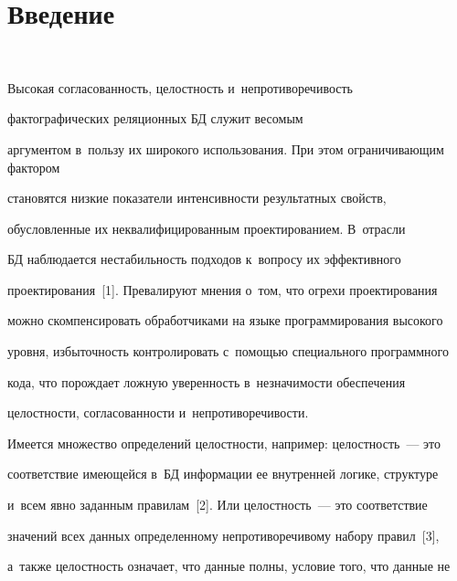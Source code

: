 





 \thispagestyle{headings}

 

 \vspace*{-18pt}

  

\section{Введение}



\vspace*{-2pt}

\

  Высокая согласованность, целостность и~непротиворечивость 

фактографических реляционных БД служит весомым 

аргументом в~пользу их широкого использования. При этом ограничивающим фактором 

становятся низкие показатели интенсивности результатных свойств, 

обусловленные их неквалифицированным проектированием. В~отрасли 

БД наблюдается нестабильность подходов к~вопросу их эффективного 

проектирования~[1]. Превалируют мнения о~том, что огрехи проектирования 

можно скомпенсировать обработчиками на языке программирования высокого 

уровня, избыточность контролировать с~помощью специального программного 

кода, что порождает ложную уверенность в~незначимости обеспечения 

целостности, согласованности и~непротиворечивости.

  

  Имеется множество определений целостности, например: целостность~--- это 

соответствие имеющейся в~БД информации ее внутренней логике, структуре 

и~всем явно заданным правилам~[2]. Или целостность~--- это соответствие 

значений всех данных определенному непротиворечивому набору правил~[3], 

а~также целостность означает, что данные полны, условие того, что данные не 

